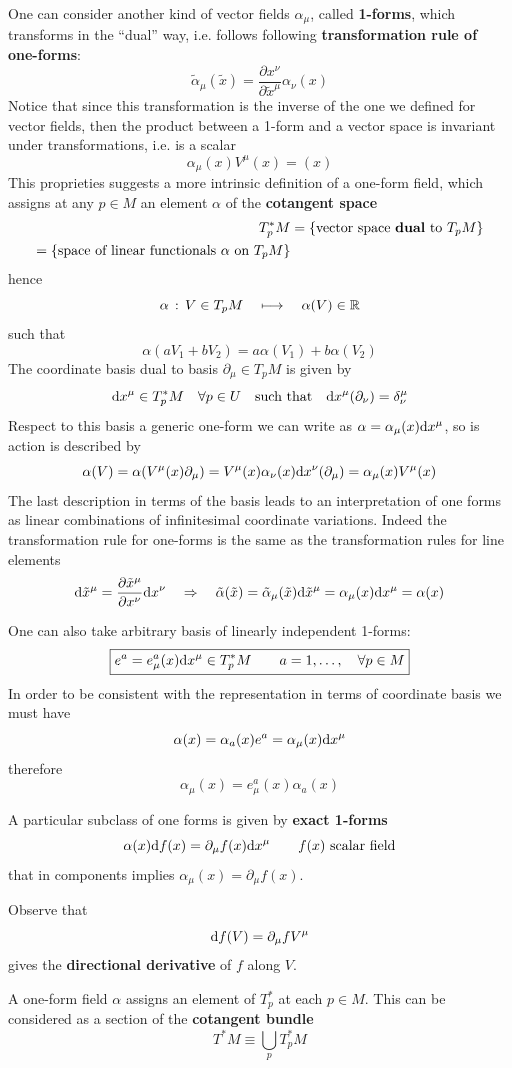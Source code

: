 \documentclass[../main/main.tex]{subfiles}
\begin{document}
\begin{definition}{}

One can consider another kind of vector fields $\alpha_\mu$, called \textbf{1-forms}, which transforms in the ``dual'' way, i.e. follows following \textbf{transformation rule of one-forms}:
\[\boxed{
\tilde\alpha_\mu(\tilde x)=\frac{\partial x^\nu}{\partial\tilde x^\mu}\alpha_\nu(x)
}\]
Notice that since this transformation is the inverse of the one we defined for vector fields, then the product between a 1-form and a vector space is invariant under transformations, i.e. is a scalar
\[\alpha_\mu(x)V^\mu(x)=(x)\]
This proprieties suggests a  more intrinsic definition of a one-form field, which assigns at any $p\in M$ an element $\alpha$ of the \textbf{cotangent space}
\begin{align*}
T^*_pM&=\{\text{vector space \textbf{dual} to }T_pM\}\\
=\{\text{space of linear functionals $\alpha$ on }T_pM\}
\end{align*}
hence
\[\alpha\,:\, V\in  T_pM\quad\longmapsto \quad\alpha(V)\in\mathbb{R}\]
such that
\[\alpha(aV_1+bV_2)=a\alpha(V_1)+b\alpha(V_2)\]
The coordinate basis dual to basis $\partial_\mu\in T_pM$ is given by
\[\textup{d} x^\mu\in T^*_p M\quad \forall p\in U\quad\text{such that} \quad\textup{d} x^\mu(\partial_\nu)=\delta^\mu_\nu\]
Respect to this basis a generic one-form we can write as $\alpha=\alpha_\mu(x)\textup{d} x^\mu$, so is action is described by
\[\alpha(V)=\alpha(V^\mu(x)\partial_\mu)=V^\mu(x)\alpha_\nu(x)\textup{d} x^\nu(\partial_\mu)=\alpha_\mu(x)V^\mu(x)\]
The last description in terms of the basis leads to an interpretation of one forms as linear combinations of infinitesimal coordinate variations. Indeed the transformation rule for one-forms is the same as the transformation rules for line elements
\[\textup{d} \tilde x^\mu=\frac{\partial \tilde x^\mu}{\partial x^\nu}\textup{d} x^\nu\quad\Rightarrow
\quad\tilde \alpha(\tilde x)=\tilde\alpha_\mu(\tilde x)\textup{d}\tilde x^\mu=\alpha_\mu(x)\textup{d} x^\mu=\alpha(x)\]

One can also take arbitrary basis of linearly independent 1-forms:
\[\boxed{
e^a=e^a_\mu(x)\textup{d} x^\mu\in T^*_pM	\qquad a=1,\dots,\quad\forall p\in M
}\]
In order to be consistent with the representation in terms of coordinate basis we must have
\[\alpha(x)=\alpha_a(x)e^a=\alpha_\mu(x)\textup{d} x^\mu\]
therefore
\[\alpha_\mu(x)=e^a_\mu(x)\alpha_a(x)\]

A particular subclass of one forms is given by \textbf{exact 1-forms}
\[\alpha(x)\textup{d} f(x)=\partial_\mu f(x)\textup{d} x^\mu\qquad f(x)\text{ scalar field}\]
that in components implies $\alpha_\mu(x)=\partial_\mu f(x)$.

Observe that 
\[\textup{d} f(V)=\partial_\mu f V^\mu\]
gives the \textbf{directional derivative} of $f$ along $V$.

A one-form field $\alpha$ assigns an element of $T^*_p$ at each $p\in M$. This can be considered as a section of the \textbf{cotangent bundle}
\[T^*M\equiv\bigcup_pT^*_pM\]

\end{definition}
\end{document}
